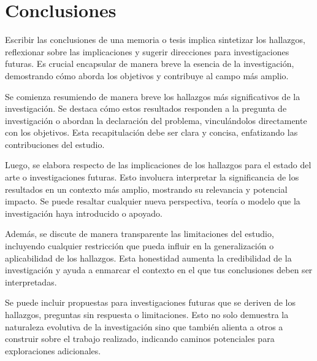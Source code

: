 \section{Conclusiones}

Escribir las conclusiones de una memoria o tesis implica sintetizar los hallazgos, reflexionar sobre las implicaciones y sugerir direcciones para investigaciones futuras. Es crucial encapsular de manera breve la esencia de la investigación, demostrando cómo aborda los objetivos y contribuye al campo más amplio. 

Se comienza resumiendo de manera breve los hallazgos más significativos de la investigación. Se destaca cómo estos resultados responden a la pregunta de investigación o abordan la declaración del problema, vinculándolos directamente con los objetivos. Esta recapitulación debe ser clara y concisa, enfatizando las contribuciones del estudio.

Luego, se elabora respecto de las implicaciones de los hallazgos para el estado del arte o investigaciones futuras. Esto involucra interpretar la significancia de los resultados en un contexto más amplio, mostrando su relevancia y potencial impacto. Se puede resaltar cualquier nueva perspectiva, teoría o modelo que la investigación haya introducido o apoyado.

Además, se discute de manera transparente las limitaciones del estudio, incluyendo cualquier restricción que pueda influir en la generalización o aplicabilidad de los hallazgos. Esta honestidad aumenta la credibilidad de la investigación y ayuda a enmarcar el contexto en el que tus conclusiones deben ser interpretadas.

Se puede incluir propuestas para investigaciones futuras que se deriven de los hallazgos, preguntas sin respuesta o limitaciones. Esto no solo demuestra la naturaleza evolutiva de la investigación sino que también alienta a otros a construir sobre el trabajo realizado, indicando caminos potenciales para exploraciones adicionales.






